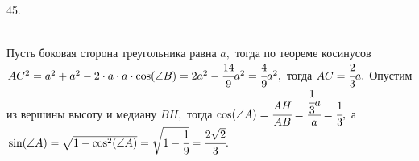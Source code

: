\documentclass[12pt]{article}
\begin{document}
45. \begin{figure}[ht!]
\end{figure}\\
Пусть боковая сторона треугольника равна $a,$ тогда по теореме косинусов $AC^2=a^2+a^2-2\cdot a\cdot a\cdot \cos(\angle B)=2a^2-\cfrac{14}{9}a^2=\cfrac{4}{9}a^2,$
тогда $AC=\cfrac{2}{3}a.$ Опустим из вершины высоту и медиану $BH,$ тогда $\cos(\angle A)=\cfrac{AH}{AB}=\cfrac{\cfrac{1}{3}a}{a}=\cfrac{1}{3},$
а $\sin(\angle A)=\sqrt{1-\cos^2(\angle A)}=\sqrt{1-\cfrac{1}{9}}=\cfrac{2\sqrt{2}}{3}.$\newpage\noindent
\end{document}
